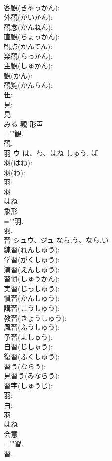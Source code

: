 \documentclass[8pt]{extreport}
\begin{document}
\begin{CJK}{UTF8}{min}
\\	客観(きゃっかん): 
\\	外観(がいかん): 
\\	観念(かんねん): 
\\	直観(ちょっかん): 
\\	観点(かんてん): 
\\	楽観(らっかん): 
\\	主観(しゅかん): 
\\	観(かん): 
\\	観覧(かんらん): 
\\	隹: 
\\	見: 
\\	見	
\\	みる	觀	形声 
\\	=""観.
\\	観.
\\	羽	ウ	は、わ、はね	しゅう, ば	
\\	羽(はね): 
\\	羽(わ): 
\\	羽: 
\\	羽	
\\	はね	
\\	象形 
\\	=""羽.
\\	羽.
\\	習	シュウ、ジュ	なら.う、なら.い		
\\	練習(れんしゅう): 
\\	学習(がくしゅう): 
\\	演習(えんしゅう): 
\\	習慣(しゅうかん): 
\\	実習(じっしゅう): 
\\	慣習(かんしゅう): 
\\	講習(こうしゅう): 
\\	教習(きょうしゅう): 
\\	風習(ふうしゅう): 
\\	予習(よしゅう): 
\\	自習(じしゅう): 
\\	復習(ふくしゅう): 
\\	習う(ならう): 
\\	見習う(みならう): 
\\	習字(しゅうじ): 
\\	羽: 
\\	白: 
\\	羽	
\\	はね	
\\	会意 
\\	=""習.
\\	習.

\end{CJK}
\end{document}
